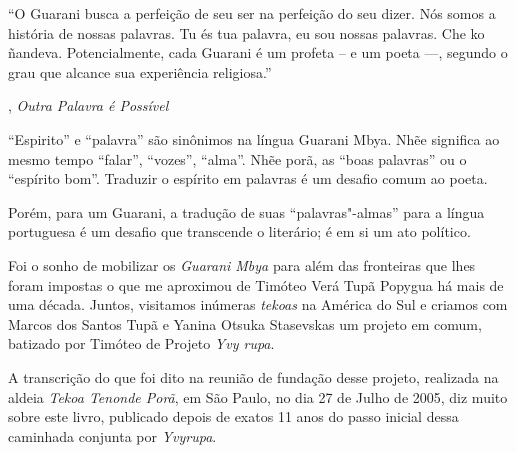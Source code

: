  

 

 

\epigraph{``O Guarani busca a perfeição de seu ser na perfeição do seu dizer. Nós
somos a história de nossas palavras. Tu és tua palavra, eu sou nossas
palavras. Che ko ñandeva. Potencialmente, cada Guarani é um profeta -- e
um poeta \mbox{---,} segundo o grau que alcance sua experiência religiosa.''}{, \emph{Outra Palavra é Possível}} 

 

``Espirito'' e ``palavra'' são sinônimos na língua Guarani Mbya.
Nhẽe significa ao mesmo tempo ``falar'', ``vozes'', ``alma''.
Nhẽe porã, as ``boas palavras'' ou o ``espírito bom''.
Traduzir o espírito em palavras é um desafio comum ao poeta.

Porém, para um Guarani, a tradução de suas ``palavras"-almas'' para a
língua portuguesa é um desafio que transcende o literário; é em si um
ato político.

Foi o sonho de mobilizar os \emph{Guarani Mbya} para além das fronteiras
que lhes foram impostas o que me aproximou de Timóteo Verá Tupã Popygua
há mais de uma década. Juntos, visitamos inúmeras \emph{tekoas} na
América do Sul e criamos com Marcos dos Santos Tupã e Yanina Otsuka
Stasevskas um projeto em comum, batizado por Timóteo de
{Projeto} \emph{{Yvy rupa}}.

A transcrição do que foi dito na reunião de fundação desse projeto,
realizada na aldeia \emph{Tekoa Tenonde Porã}, em São Paulo, no dia 27
de Julho de 2005, diz muito sobre este livro, publicado depois de exatos
11 anos do passo inicial dessa caminhada conjunta por \emph{Yvyrupa}.

 

